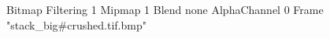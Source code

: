 {Bitmap
	{Filtering 1}
	{Mipmap 1}
	{Blend none}
	{AlphaChannel 0}
	{Frame "stack_big#crushed.tif.bmp"}
}
